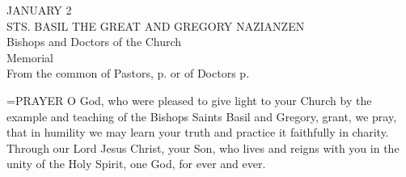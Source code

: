 \begin{center}\normalsize JANUARY 2\\
\footnotesize STS. BASIL THE GREAT AND GREGORY NAZIANZEN\\
\footnotesize Bishops and Doctors of the Church\\
\footnotesize Memorial\\
\footnotesize From the common of Pastors, p.   or of Doctors p. \\
\end{center}

\hangindent=\parindent \small{PRAYER 
O God, who were pleased to give light to your Church
by the example and teaching
of the Bishops Saints Basil and Gregory,
grant, we pray,
that in humility we may learn your truth
and practice it faithfully in charity.
Through our Lord Jesus Christ, your Son,
who lives and reigns with you in the unity of the Holy Spirit,
one God, for ever and ever.\\}
 
 

